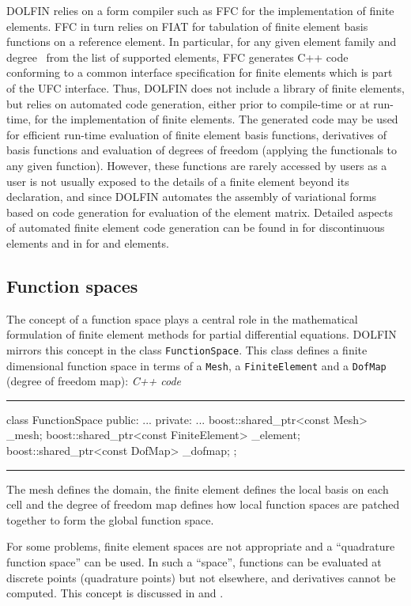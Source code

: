 \documentclass[acmtoms]{acmtrans2m}
\newenvironment{cppcode}[1]{\center\minipage{#1\textwidth}\footnotesize\hfill\it C++ code \rm\vspace{0.1cm}\hrule\renewcommand{\baselinestretch}{0.9}\footnotesize\verbatim}{\endverbatim\hrule\normalsize\endminipage\newline\endcenter}
\newcommand{\emp}[1]{\texttt{#1}}
\newcommand{\dolfin}{DOLFIN}
\begin{document}
\dolfin{} relies on a form compiler such as FFC for the implementation
of finite elements. FFC in turn relies on FIAT for tabulation of
finite element basis functions on a reference element. In particular,
for any given element family and degree~ from the list of supported
elements, FFC generates C++ code conforming to a common interface
specification for finite elements which is part of the UFC
interface. Thus, \dolfin{} does not include a library of finite
elements, but relies on automated code generation, either prior to
compile-time or at run-time, for the implementation of finite
elements. The generated code may be used for efficient run-time
evaluation of finite element basis functions, derivatives of basis
functions and evaluation of degrees of freedom (applying the
functionals to any given function). However, these
functions are rarely accessed by users as a user is not usually
exposed to the details of a finite element beyond its declaration, and
since \dolfin{} automates the assembly of variational forms based on
code generation for evaluation of the element matrix. Detailed aspects
of automated finite element code generation can be found in
 for discontinuous elements and in
 for  and  elements.
\subsection{Function spaces}

The concept of a function space plays a central role in the
mathematical formulation of finite element methods for partial
differential equations. \dolfin{} mirrors this concept in the class
\emp{FunctionSpace}. This class defines a finite dimensional function
space in terms of a \emp{Mesh}, a \emp{FiniteElement} and a
\emp{DofMap} (degree of freedom map):
\begin{cppcode}{0.9}
class FunctionSpace
{
public:
  ...
private:
  ...
  boost::shared_ptr<const Mesh> _mesh;
  boost::shared_ptr<const FiniteElement> _element;
  boost::shared_ptr<const DofMap> _dofmap;
};
\end{cppcode}
The mesh defines the domain, the finite element defines the local
basis on each cell and the degree of freedom map defines how local
function spaces are patched together to form the global function
space.


For some
problems, finite element spaces are not appropriate and
a ``quadrature function space''
can be used. In such a ``space'', functions can be evaluated at discrete
points (quadrature points) but not elsewhere, and derivatives cannot
be computed. This concept is discussed in 
and .
\end{document}

